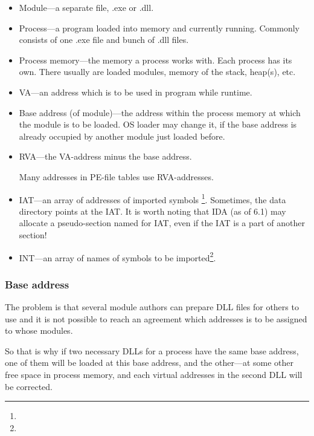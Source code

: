 \begin{itemize}
\item Module---a separate file, .exe or .dll.

\item Process---a program loaded into memory and currently running.  Commonly consists of one .exe file and bunch of .dll files.

\item Process memory---the memory a process works with.  Each process has its own.
There usually are loaded modules, memory of the stack, \gls{heap}(s), etc.

\item \ac{VA}---an address which is to be used in program while runtime.

\item Base address (of module)---the address within the process memory at which the module is to be loaded.
\ac{OS} loader may change it, if the base address is already occupied by another module just loaded before.

\item \ac{RVA}---the \ac{VA}-address minus the base address.

Many addresses in PE-file tables use \ac{RVA}-addresses.


\item \ac{IAT}---an array of addresses of imported symbols \footnote{\PietrekPE}.
Sometimes, the  data directory points at the \ac{IAT}.
\label{IDA_idata}
It is worth noting that \ac{IDA} (as of 6.1) may allocate a pseudo-section named  for
\ac{IAT}, even if the \ac{IAT} is a part of another section!

\item \ac{INT}---an array of names of symbols to be imported\footnote{\PietrekPE}.
\end{itemize}

\subsubsection{Base address}

The problem is that several module authors can prepare DLL files for others to use and it is not possible
to reach an agreement which addresses is to be assigned to whose modules.

So that is why if two necessary DLLs for a process have the same base address,
one of them will be loaded at this base address, and the other---at some other free space in process memory,
and each virtual addresses in the second DLL will be corrected.

